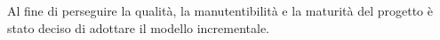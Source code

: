 Al fine di perseguire la qualità, la manutentibilità e la maturità del progetto
è stato deciso di adottare il {modello incrementale}.